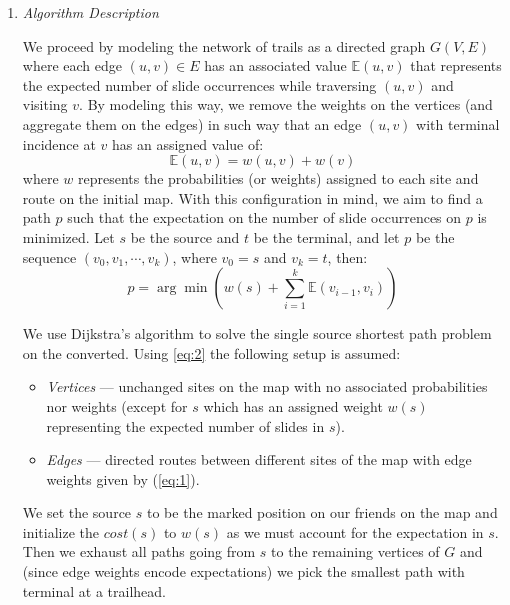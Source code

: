 \documentclass[10pt, letterpaper]{article}
\begin{document}
\begin{enumerate}[label={\bfseries Q\arabic*.}]
  \item
    {\itshape Algorithm Description} \par
    We proceed by modeling the network of trails as a directed graph $G(V, E)$ where each
    edge $(u,v) \in E$ has an associated value $\mathbb{E}(u,v)$ that represents the expected
    number of slide occurrences while traversing $(u,v)$ and visiting $v$. By modeling this
    way, we remove the weights on the vertices (and aggregate them on the edges) in such way
    that an edge $(u,v)$ with terminal incidence at $v$ has an assigned value of:
    \begin{equation}
      \label{eq:1}
      \mathbb{E}(u,v) = w(u,v) + w(v)
    \end{equation}
    where $w$ represents the probabilities (or weights) assigned to each site and route on
    the initial map. With this configuration in mind, we aim to find a path $p$ such that the
    expectation on the number of slide occurrences on $p$ is minimized. Let $s$ be the source
    and $t$ be the terminal, and let $p$ be the sequence $(v_0, v_1, \cdots, v_k)$, where $v_0
    = s$ and $v_k = t$, then:
    \begin{equation}
      \label{eq:2}
      p = \arg \min \left(w(s) + \sum_{i=1}^k \mathbb{E}(v_{i-1}, v_i)\right)
    \end{equation}

    We use Dijkstra's algorithm to solve the single source shortest path problem on the
    converted.  Using \autoref{eq:2} the following setup is assumed:
    \begin{itemize}[label={\large$\circ$}]
      \item
        {\itshape Vertices} --- unchanged sites on the map with no associated probabilities
        nor weights (except for $s$ which has an assigned weight $w(s)$ representing the
        expected number of slides in $s$).
      \item
        {\itshape Edges} --- directed routes between different sites of the map with edge
        weights given by (\ref{eq:1}).
    \end{itemize}
    We set the source $s$ to be the marked position on our friends on the map and initialize
    the $cost(s)$ to $w(s)$ as we must account for the expectation in $s$. Then we exhaust
    all paths going from $s$ to the remaining vertices of $G$ and (since edge weights encode
    expectations) we pick the smallest path with terminal at a trailhead.


\end{enumerate}
\end{document}
